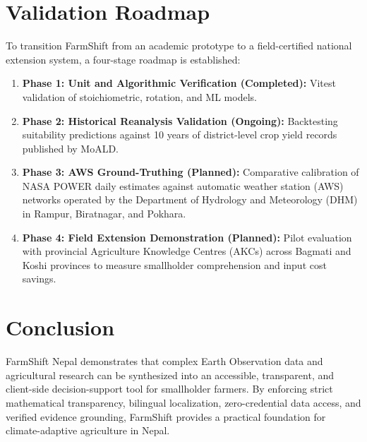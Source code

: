 \documentclass[11pt,a4paper]{report}
\begin{document}
\section{Validation Roadmap}
To transition FarmShift from an academic prototype to a field-certified national extension system, a four-stage roadmap is established:
\begin{enumerate}
  \item \textbf{Phase 1: Unit and Algorithmic Verification (Completed):} Vitest validation of stoichiometric, rotation, and ML models.
  \item \textbf{Phase 2: Historical Reanalysis Validation (Ongoing):} Backtesting suitability predictions against 10 years of district-level crop yield records published by MoALD.
  \item \textbf{Phase 3: AWS Ground-Truthing (Planned):} Comparative calibration of NASA POWER daily estimates against automatic weather station (AWS) networks operated by the Department of Hydrology and Meteorology (DHM) in Rampur, Biratnagar, and Pokhara.
  \item \textbf{Phase 4: Field Extension Demonstration (Planned):} Pilot evaluation with provincial Agriculture Knowledge Centres (AKCs) across Bagmati and Koshi provinces to measure smallholder comprehension and input cost savings.
\end{enumerate}

\section{Conclusion}
FarmShift Nepal demonstrates that complex Earth Observation data and agricultural research can be synthesized into an accessible, transparent, and client-side decision-support tool for smallholder farmers. By enforcing strict mathematical transparency, bilingual localization, zero-credential data access, and verified evidence grounding, FarmShift provides a practical foundation for climate-adaptive agriculture in Nepal.



\end{document}
